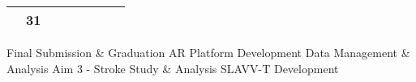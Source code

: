 {\begin{tabularx}{\linewidth}{|l!{\vrule width \myLenLineThicknessThick}*{7}{@{}X@{}|}}
       & 
    
      
      
        \begin{minipage}[t]{6mm}\centering{}31\end{minipage}
      
       & 
    
      
      
      
        \\  \hline 
      
    
  
  
  \end{tabularx}
}
\vfill{\centering{} \small{Final Submission \& Graduation}\hspace{1.5em} \small{AR Platform Development}\hspace{1.5em} \small{Data Management \& Analysis}\hspace{1.5em} \small{Aim 3 - Stroke Study \& Analysis}\hspace{1.5em} \small{SLAVV-T Development}\hspace{1.5em}\par}

